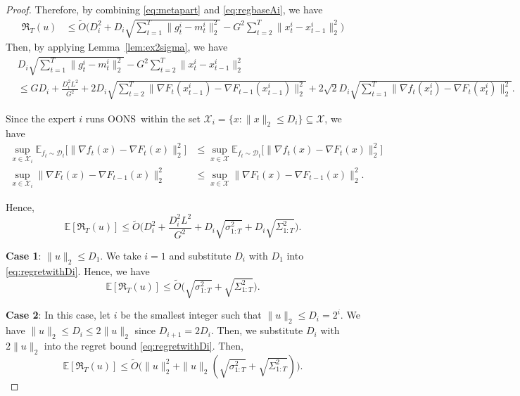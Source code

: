 \documentclass{article}
\theoremstyle{plain}
\theoremstyle{definition}
\theoremstyle{remark}
\newcommand{\cD}{\mathcal{D}}
\newcommand{\cX}{\mathcal{X}}
\renewcommand{\Bbb}{\mathbb}
\newcommand{\E}{{\Bbb E}}
\newcommand{\oons}{{\sc OONS}}
\newcommand{\regret}{\mathfrak{R}}
\renewcommand{\tilde}{\widetilde}
\begin{document}
\begin{proof}
Therefore, by combining \eqref{eq:metapart} and \eqref{eq:regbaseAi}, we have 
\begin{align*}
\regret_T(u)&\leq \tilde{O}\Big(D_i^2+D_i\sqrt{\sum_{t=1}^{T}\|g_{t}^i-m_t^i\|_2^2}-G^2\sum_{t=2}^T\|x_t^i-x_{t-1}^i\|_2^2\Big)
\end{align*}
Then, by applying Lemma~\ref{lem:ex2sigma}, we have
\begin{align*}
&D_i\sqrt{\sum_{t=1}^{T}\|g_{t}^i-m_t^i\|_2^2}-G^2\sum_{t=2}^T\|x_t^i-x_{t-1}^i\|_2^2\\
&\leq GD_i+\frac{D_i^2L^2}{G^2}+2D_i\sqrt{\sum_{t=2}^T\|\nabla F_t(x^i_{t-1})-\nabla F_{t-1}(x^i_{t-1})\|_2^2}+2\sqrt{2}D_i\sqrt{\sum_{t=1}^T\|\nabla f_t(x_t^i)-\nabla F_t(x_{t}^i)\|_2^2}.
\end{align*}

Since the expert $i$ runs \oons\ within the set $\cX_i=\{x:\|x\|_2\leq D_i\}\subseteq \cX$, we have
\begin{align*}
\sup_{x\in\cX_i}\E_{f_t \sim \cD_t}  \big[ \| \nabla f_t(x) - \nabla F_{t}(x) \|_2^2 \big]&\leq\sup_{x \in \cX} \E_{f_t \sim \cD_t}  \big[ \| \nabla f_t(x) - \nabla F_{t}(x) \|_2^2 \big]\\
\sup_{x\in\cX_i}   \| \nabla F_t(x) - \nabla F_{t-1}(x) \|_2^2 &\leq\sup_{x \in \cX}  \| \nabla F_t(x) - \nabla F_{t-1}(x) \|_2^2.
\end{align*}

Hence, 
\begin{equation}\label{eq:regretwithDi}
\mathbb{E}[\regret_T(u)]\leq \tilde{O}\Big(D_i^2+\frac{D_i^2L^2}{G^2}+D_i\sqrt{\sigma_{1:T}^2}+D_i\sqrt{\Sigma_{1:T}^2}\Big).
\end{equation}

\textbf{Case 1}: $\|u\|_2\leq D_1$. We take $i=1$ and substitute $D_i$ with $D_1$ into \eqref{eq:regretwithDi}. Hence, we have
\begin{equation*}
\mathbb{E}[\regret_T(u)]\leq \tilde{O}\Big(\sqrt{\sigma_{1:T}^2}+\sqrt{\Sigma_{1:T}^2}\Big).
\end{equation*}

\textbf{Case 2}:
In this case, let $i$ be the smallest integer such that  $\|u\|_2\leq D_i=2^i$. We have $\|u\|_2\leq D_i\leq 2\|u\|_2$ since $D_{i+1}=2D_i$. Then, we substitute $D_i$ with $2\|u\|_2$ into the regret bound \eqref{eq:regretwithDi}. Then,
\begin{equation*}
\mathbb{E}[\regret_T(u)]\leq \tilde{O}\Big(\|u\|_2^2+\|u\|_2(\sqrt{\sigma_{1:T}^2}+\sqrt{\Sigma_{1:T}^2})\Big).
\end{equation*}


\end{proof}
\end{document}
